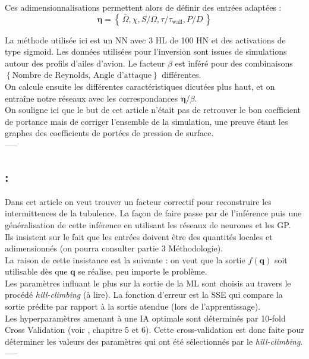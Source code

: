 \documentclass[a4paper,12pt]{report}
\newcommand\bk{\color{black}}
\newcommand\red{\color{red}}
\numberwithin{equation}{section} %
\begin{document}
\noindent Ces adimensionnalisations permettent alors de définir des entrées adaptées :
\begin{equation*}
\mathbf{\eta} = \left\{ \, \overline{\Omega}, \chi, S/\Omega, \tau/\tau_{\text{wall}}, P/D\, \right\}
\end{equation*}

La méthode utilisée ici est un \red NN \bk avec 3 HL de 100 HN et des activations de type sigmoid. Les données utilisées pour l'inversion sont issues de simulations autour des profils d'ailes d'avion. Le facteur $\beta$ est inféré pour des combinaisons $\left \{ \text{Nombre de Reynolds, Angle d'attaque} \right \}$ différentes. \\
On calcule ensuite les différentes caractéristiques dicutées plus haut, et on entraîne notre réseaux avec les correspondances $\mathbf{\eta}$/$\beta$.\\
On souligne ici que le but de cet article n'était pas de retrouver le bon coefficient de portance mais de corriger l'ensemble de la simulation, une preuve étant les graphes des coefficients de portées de pression de surface.
\\-----\\[0.5cm]

\subsection*{\textbf{\cite{duraisamy2015new}} : }
Dans cet article on veut trouver un facteur correctif pour reconstruire les intermittences de la tubulence. La façon de faire passe par de l'inférence puis une généralisation de cette inférence en utilisant les réseaux de neurones et les GP.\\
Ils insistent sur le fait que les entrées doivent être des quantités locales et adimensionnés (on pourra consulter \cite{tracey2015machine} partie 3 Méthodologie).\\
La raison de cette insistance est la suivante : on veut que la sortie $f(\textbf{q})$ soit utilisable dès que $\textbf{q}$ se réalise, peu importe le problème.\\

\noindent Les paramètres influant le plus sur la sortie de la ML sont choisis au travers le procédé \textit{hill-climbing} \cite{kohavi1997wrappers} (à lire). La fonction d'erreur est la SSE qui compare la sortie prédite par rapport à la sortie atendue (lors de l'apprentissage).\\
Les hyperparamètres amenant à une IA optimale sont déterminés par 10-fold Cross Validation (voir \cite{muller2016introduction}, chapitre 5 et 6). Cette cross-validation est donc faite pour déterminer les valeurs des paramètres qui ont été sélectionnés par le \textit{hill-climbing}.\\
-----\\[0.5cm]
\end{document}
